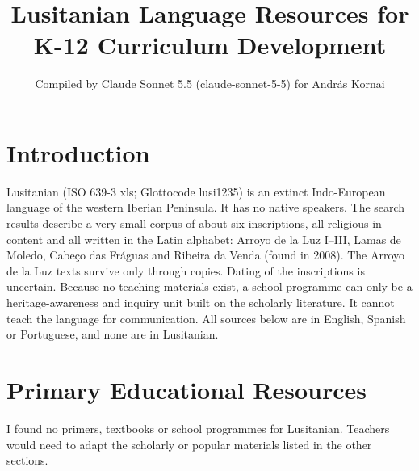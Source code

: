 \documentclass[12pt]{article}
\title{Lusitanian Language Resources for K-12 Curriculum Development}
\author{Compiled by Claude Sonnet 5.5 (claude-sonnet-5-5) for Andr\'as Kornai}
\date{}
\begin{document}
\maketitle

\section{Introduction}
Lusitanian (ISO 639-3 xls; Glottocode lusi1235) is an extinct Indo-European language of the western Iberian Peninsula. It has no native speakers. The search results describe a very small corpus of about six inscriptions, all religious in content and all written in the Latin alphabet: Arroyo de la Luz I--III, Lamas de Moledo, Cabeço das Fráguas and Ribeira da Venda (found in 2008). The Arroyo de la Luz texts survive only through copies. Dating of the inscriptions is uncertain. Because no teaching materials exist, a school programme can only be a heritage-awareness and inquiry unit built on the scholarly literature. It cannot teach the language for communication. All sources below are in English, Spanish or Portuguese, and none are in Lusitanian.

\section{Primary Educational Resources}
I found no primers, textbooks or school programmes for Lusitanian. Teachers would need to adapt the scholarly or popular materials listed in the other sections.
\end{document}
